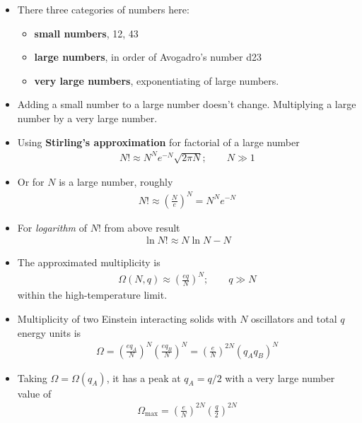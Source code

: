 \documentclass{book}
\begin{document}
\begin{itemize}
	\item There three categories of numbers here:
	      \begin{itemize}
		      \item	\textbf{small numbers}, 12, 43
		      \item	\textbf{large numbers}, in order of Avogadro's number \num{d23}
		      \item	\textbf{very large numbers}, exponentiating of large numbers.
	      \end{itemize}
	\item Adding a small number to a large number doesn't change.
	      Multiplying a large number by a very large number.
	\item Using \textbf{Stirling's approximation} for factorial of a large number
	      \begin{align}
		      \label{eq:Stirling}
		      N! \approx N^{N} e^{-N} \sqrt{2 \pi N} ; \qquad  N \gg 1
	      \end{align}
  \item Or for $N$ is a large number, roughly
				\begin{align}
					N! \approx \left( \frac{N}{e} \right)^N = N^N e^{-N}
				\end{align}
  \item For \textit{logarithm} of $N!$ from above result
				\begin{align}
					\ln{N!} \approx N \ln{N} - N
				\end{align}


	\item The approximated multiplicity is
	      \begin{align}
		      \label{eq:appox omega}
		      \Omega (N, q) \approx \left( \frac{eq}{N} \right)^{N}; \qquad q \gg N
	      \end{align}
	      within the high-temperature limit.
	\item Multiplicity of two Einstein interacting solids with $N$ oscillators and total $q$ energy units is
	      \begin{align}
		      \label{eq:total multipliciy}
		      \Omega = \left( \frac{eq_{A}}{N} \right)^{N}  \left( \frac{eq_B}{N} \right)^{N}
		      = \left( \frac{e}{N} \right)^{2N} (q_A q_B)^N
	      \end{align}
	\item Taking $\Omega = \Omega(q_A)$, it has a peak at $q_A= q/2$ with a very large number value of
	      \begin{align}
		      \label{eq:Omega max}
		      \Omega_{\text{max}} = \left( \frac{e}{N} \right)^{2N} \left(\frac{q}{2} \right)^{2N}
	      \end{align}


\end{itemize}
\end{document}
